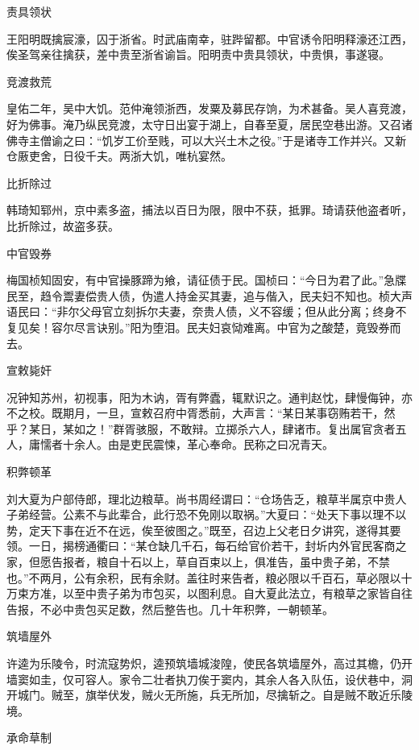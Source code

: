 \documentclass[a4paper,12pt,UTF8,twoside]{ctexbook}
\begin{document}
    责具领状
    
    王阳明既擒宸濠，囚于浙省。时武庙南幸，驻跸留都。中官诱令阳明释濠还江西，俟圣驾亲往擒获，差中贵至浙省谕旨。阳明责中贵具领状，中贵惧，事遂寝。
    
    竞渡救荒
    
    皇佑二年，吴中大饥。范仲淹领浙西，发粟及募民存饷，为术甚备。吴人喜竞渡，好为佛事。淹乃纵民竞渡，太守日出宴于湖上，自春至夏，居民空巷出游。又召诸佛寺主僧谕之曰：“饥岁工价至贱，可以大兴土木之役。”于是诸寺工作并兴。又新仓厫吏舍，日役千夫。两浙大饥，唯杭宴然。
    
    比折除过
    
    韩琦知郓州，京中素多盗，捕法以百日为限，限中不获，抵罪。琦请获他盗者听，比折除过，故盗多获。
    
    中官毁券
    
    梅国桢知固安，有中官操豚蹄为飨，请征债于民。国桢曰：“今日为君了此。”急牒民至，趋令鬻妻偿贵人债，伪遣人持金买其妻，追与偕入，民夫妇不知也。桢大声语民曰：“非尔父母官立刻拆尔夫妻，奈贵人债，义不容缓；但从此分离；终身不复见矣！容尔尽言诀别。”阳为堕泪。民夫妇哀恸难离。中官为之酸楚，竟毁券而去。
    
    宣敕毙奸
    
    况钟知苏州，初视事，阳为木讷，胥有弊蠹，辄默识之。通判赵忱，肆慢侮钟，亦不之校。既期月，一旦，宣敕召府中胥悉前，大声言：“某日某事窃贿若干，然乎？某日，某如之！”群胥骇服，不敢辩。立掷杀六人，肆诸市。复出属官贪者五人，庸懦者十余人。由是吏民震悚，革心奉命。民称之曰况青天。
    
    积弊顿革
    
    刘大夏为户部侍郎，理北边粮草。尚书周经谓曰：“仓场告乏，粮草半属京中贵人子弟经营。公素不与此辈合，此行恐不免刚以取祸。”大夏曰：“处天下事以理不以势，定天下事在近不在远，俟至彼图之。”既至，召边上父老日夕讲究，遂得其要领。一日，揭榜通衢曰：“某仓缺几千石，每石给官价若干，封圻内外官民客商之家，但愿告报者，粮自十石以上，草自百束以上，俱准告，虽中贵子弟，不禁也。”不两月，公有余积，民有余财。盖往时来告者，粮必限以千百石，草必限以十万束方准，以至中贵子弟为市包买，以图利息。自大夏此法立，有粮草之家皆自往告报，不必中贵包买足数，然后整告也。几十年积弊，一朝顿革。
    
    筑墙屋外
    
    许逵为乐陵令，时流寇势炽，逵预筑墙城浚隍，使民各筑墙屋外，高过其檐，仍开墙窦如圭，仅可容人。家令二壮者执刀俟于窦内，其余人各入队伍，设伏巷中，洞开城门。贼至，旗举伏发，贼火无所施，兵无所加，尽擒斩之。自是贼不敢近乐陵境。
    
    承命草制
    
\end{document}
